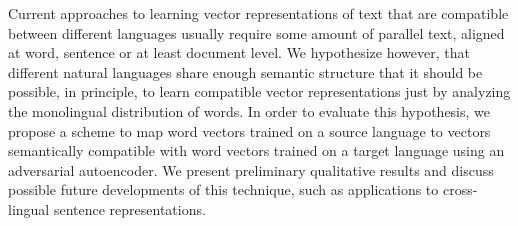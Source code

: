 Current approaches to learning vector representations of text that are compatible between different languages usually require some amount of parallel text, aligned at word, sentence or at least document level. We hypothesize however, that different natural languages share enough semantic structure that it should be possible, in principle, to learn compatible vector representations just by analyzing the monolingual distribution of words. In order to evaluate this hypothesis, we propose a scheme to map word vectors trained on a source language to vectors semantically compatible with word vectors trained on a target language using an adversarial autoencoder. We present preliminary qualitative results and discuss possible future developments of this technique, such as applications to cross-lingual sentence representations.
